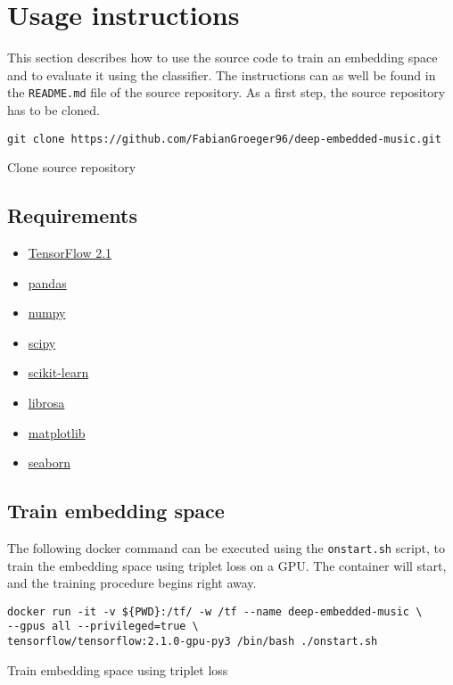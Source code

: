 \clearpage
\section{Usage instructions}
\label{app:Usage-Instructions}
This section describes how to use the source code to train an embedding space and to evaluate it using the classifier. The instructions can as well be found in the \texttt{README.md} file of the source repository. As a first step, the source repository has to be cloned.
\begin{code}[H]
\begin{verbatim}
git clone https://github.com/FabianGroeger96/deep-embedded-music.git
\end{verbatim}
\caption{Clone source repository}
\label{code:Clone-Repo}
\end{code}

\subsection{Requirements}
\begin{itemize}
\setlength\itemsep{0em}
\item
  \href{https://github.com/tensorflow/tensorflow}{TensorFlow 2.1}
\item
  \href{https://pandas.pydata.org/}{pandas}
\item
  \href{https://numpy.org/}{numpy}
\item
  \href{https://www.scipy.org/}{scipy}
\item
  \href{https://scikit-learn.org/stable/}{scikit-learn}
\item
  \href{https://github.com/librosa/librosa}{librosa}
\item
  \href{https://matplotlib.org/}{matplotlib}
\item
  \href{https://seaborn.pydata.org/}{seaborn}
\end{itemize}

\subsection{Train embedding space}
The following docker command can be executed using the \texttt{onstart.sh} script, to train the embedding space using triplet loss on a GPU. The container will start, and the training procedure begins right away.
\begin{code}[H]
\begin{verbatim}
docker run -it -v ${PWD}:/tf/ -w /tf --name deep-embedded-music \
--gpus all --privileged=true \
tensorflow/tensorflow:2.1.0-gpu-py3 /bin/bash ./onstart.sh
\end{verbatim}
\caption{Train embedding space using triplet loss}
\label{code:Train-triplet-loss}
\end{code}

